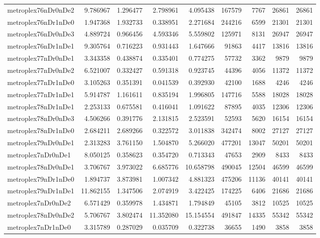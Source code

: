 \documentclass[../../../thesis.tex]{subfiles}
\begin{document}
\begin{longtable}{|l|r|r|r|r|r|r|r|r|}
metroplex76nDr0nDe2 & 9.786967 & 1.296477 & 2.798961 & 4.095438 & 167579 & 7767 & 26861 & 26861 \\
metroplex76nDr1nDe0 & 1.947368 & 1.932733 & 0.338951 & 2.271684 & 244216 & 6599 & 21301 & 21301 \\
metroplex76nDr0nDe3 & 4.889724 & 0.966456 & 4.593346 & 5.559802 & 125971 & 8131 & 26947 & 26947 \\
metroplex76nDr1nDe1 & 9.305764 & 0.716223 & 0.931443 & 1.647666 & 91863 & 4417 & 13816 & 13816 \\
metroplex77nDr0nDe1 & 3.343358 & 0.438874 & 0.335401 & 0.774275 & 57732 & 3362 & 9879 & 9879 \\
metroplex77nDr0nDe2 & 6.521007 & 0.332427 & 0.591318 & 0.923745 & 44396 & 4056 & 11372 & 11372 \\
metroplex77nDr1nDe0 & 3.105263 & 0.351391 & 0.041539 & 0.392930 & 42100 & 1688 & 4246 & 4246 \\
metroplex77nDr1nDe1 & 5.914787 & 1.161611 & 0.835194 & 1.996805 & 147716 & 5588 & 18028 & 18028 \\
metroplex78nDr1nDe1 & 2.253133 & 0.675581 & 0.416041 & 1.091622 & 87895 & 4035 & 12306 & 12306 \\
metroplex78nDr0nDe3 & 4.506266 & 0.391776 & 2.131815 & 2.523591 & 52593 & 5620 & 16154 & 16154 \\
metroplex78nDr1nDe0 & 2.684211 & 2.689266 & 0.322572 & 3.011838 & 342474 & 8002 & 27127 & 27127 \\
metroplex79nDr0nDe1 & 2.313283 & 3.761150 & 1.504870 & 5.266020 & 477201 & 13047 & 50201 & 50201 \\
metroplex7nDr0nDe1 & 8.050125 & 0.358623 & 0.354720 & 0.713343 & 47653 & 2909 & 8433 & 8433 \\
metroplex78nDr0nDe1 & 3.706767 & 3.973022 & 6.685776 & 10.658798 & 490045 & 12504 & 46599 & 46599 \\
metroplex79nDr1nDe0 & 1.894737 & 3.873981 & 1.007342 & 4.881323 & 475206 & 11136 & 40141 & 40141 \\
metroplex79nDr1nDe1 & 11.862155 & 1.347506 & 2.074919 & 3.422425 & 174225 & 6406 & 21686 & 21686 \\
metroplex7nDr0nDe2 & 6.571429 & 0.359978 & 1.434871 & 1.794849 & 45105 & 3812 & 10525 & 10525 \\
metroplex78nDr0nDe2 & 5.706767 & 3.802474 & 11.352080 & 15.154554 & 491847 & 14335 & 55342 & 55342 \\
metroplex7nDr1nDe0 & 3.315789 & 0.287029 & 0.035709 & 0.322738 & 36655 & 1490 & 3858 & 3858 \\

\end{longtable}
\end{document}
